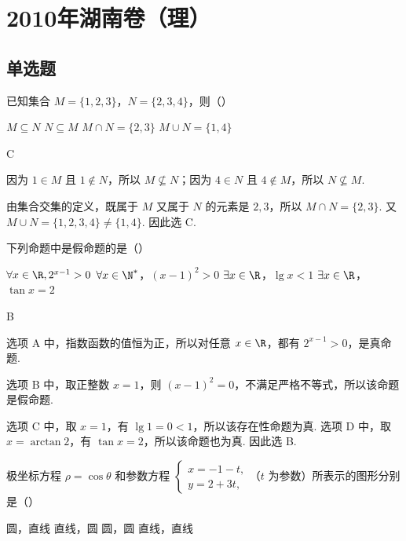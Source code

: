\chapter{2010年湖南卷（理）}

\section{单选题}

\begin{problem}
已知集合 \(M = \{1, 2, 3\}\)，\(N = \{2, 3, 4\}\)，则（\quad）

\choices
    {\(M \subseteq N\)}
    {\(N \subseteq M\)}
    {\(M \cap N = \{2, 3\}\)}
    {\(M \cup N = \{1, 4\}\)}
\end{problem}

\begin{answer}
C
\end{answer}

\begin{solution}
因为 \(1\in M\) 且 \(1\notin N\)，所以 \(M\not\subseteq N\)；因为 \(4\in N\) 且 \(4\notin M\)，所以 \(N\not\subseteq M\).

由集合交集的定义，既属于 \(M\) 又属于 \(N\) 的元素是 \(2,3\)，所以
\(M\cap N=\{2,3\}\). 又 \(M\cup N=\{1,2,3,4\}\ne\{1,4\}\). 因此选 C.
\end{solution}

\begin{problem}
下列命题中是假命题的是（\quad）

\choices
    {\(\forall x\in \R,2^{x - 1} > 0\)}
    {\(\forall x\in\N^{*}\)，\((x - 1)^{2} > 0\)}
    {\(\exists x\in \R\)，\(\lg x < 1\)}
    {\(\exists x\in \R\)，\(\tan x = 2\)}
\end{problem}

\begin{answer}
B
\end{answer}

\begin{solution}
选项 A 中，指数函数的值恒为正，所以对任意 \(x\in\R\)，都有
\(2^{x-1}>0\)，是真命题.

选项 B 中，取正整数 \(x=1\)，则 \((x-1)^2=0\)，不满足严格不等式，所以该命题是假命题.

选项 C 中，取 \(x=1\)，有 \(\lg1=0<1\)，所以该存在性命题为真. 选项 D 中，取 \(x=\arctan2\)，有 \(\tan x=2\)，所以该命题也为真. 因此选 B.
\end{solution}

\begin{problem}
极坐标方程 \(\rho = \cos \theta\) 和参数方程 \(\begin{cases}
x = -1 - t,\\
y = 2 + 3t,
\end{cases}\)（\(t\) 为参数）所表示的图形分别是（\quad）

\choices
    {圆，直线}
    {直线，圆}
    {圆，圆}
    {直线，直线}
\end{problem}

